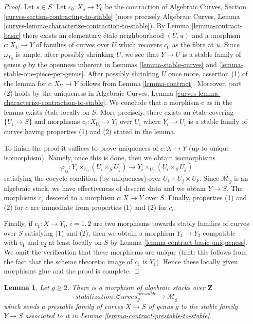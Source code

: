 \documentclass{stacks-project}
\theoremstyle{plain}
\newtheorem{lemma}[subsection]{Lemma}
\theoremstyle{definition}
\theoremstyle{remark}
\numberwithin{equation}{subsection}
\def\Curvesstack{\mathcal{C}\!\mathit{urves}}
\begin{document}
\begin{proof}
Let $s \in S$. Let $c_0 : X_s \to Y_0$ be the contraction of
Algebraic Curves, Section \ref{curves-section-contracting-to-stable}
(more precisely Algebraic Curves, Lemma
\ref{curves-lemma-characterize-contraction-to-stable}).
By Lemma \ref{lemma-contract-basic}
there exists an elementary \'etale neighbourhood
$(U, u)$ and a morphism $c : X_U \to Y$
of families of curves over $U$ which recovers
$c_0$ as the fibre at $u$.
Since $\omega_{Y_0}$ is ample, after possibly shrinking $U$,
we see that $Y \to U$ is a stable family of genus $g$
by the openness inherent in
Lemmas \ref{lemma-stable-curves} and \ref{lemma-stable-one-piece-per-genus}.
After possibly shrinking $U$ once more, assertion (1) of the lemma for
$c : X_U \to Y$ follows from Lemma \ref{lemma-contract}.
Moreover, part (2) holds by the uniqueness in Algebraic Curves, Lemma
\ref{curves-lemma-characterize-contraction-to-stable}.
We conclude that a morphism $c$ as in the lemma exists \'etale locally
on $S$. More precisely, there exists an \'etale covering
$\{U_i \to S\}$ and morphisms $c_i : X_{U_i} \to Y_i$ over $U_i$
where $Y_i \to U_i$ is a stable family of curves
having properties (1) and (2) stated in the lemma.

\medskip\noindent
To finish the proof it suffices to prove uniqueness of $c : X \to Y$
(up to unique isomorphism). Namely, once this is done, then we
obtain isomorphisms
$$
\varphi_{ij} :
Y_i \times_{U_i} (U_i \times_S U_j)
\longrightarrow
Y_i \times_{U_j} (U_i \times_S U_j)
$$
satisfying the cocycle condition (by uniqueness) over
$U_i \times U_j \times U_k$. Since $\overline{\mathcal{M}_g}$
is an algebraic stack, we have effectiveness of descent data
and we obtain $Y \to S$. The morphisms $c_i$ descend to a morphism
$c : X \to Y$ over $S$. Finally, properties (1) and (2) for $c$
are immediate from properties (1) and (2) for $c_i$.

\medskip\noindent
Finally, if $c_1 : X \to Y_i$, $i = 1, 2$ are two morphisms towards
stably families of curves over $S$ satisfying (1) and (2), then
we obtain a morphism $Y_1 \to Y_2$ compatible with $c_1$ and $c_2$
at least locally on $S$ by Lemma \ref{lemma-contract-basic-uniqueness}.
We omit the verification that these morphisms are unique
(hint: this follows from the fact that the scheme theoretic image
of $c_1$ is $Y_1$). Hence these locally given morphisms glue
and the proof is complete.
\end{proof}

\begin{lemma}
\label{lemma-stabilization-morphism}
Let $g \geq 2$. There is a morphism of algebraic stacks over $\mathbf{Z}$
$$
stabilization :
\Curvesstack^{prestable}_g
\longrightarrow
\overline{\mathcal{M}}_g
$$
which sends a prestable family of curves $X \to S$ of genus $g$
to the stable family $Y \to S$ associated to it in
Lemma \ref{lemma-contract-prestable-to-stable}.
\end{lemma}
\end{document}
